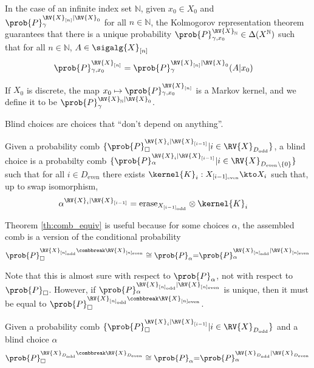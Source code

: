 In the case of an infinite index set $\mathbb{N}$, given $x_0\in X_0$ and $\prob{P}_\gamma^{\RV{X}_{[n]}|\RV{X}_0}$ for all $n\in \mathbb{N}$, the Kolmogorov representation theorem guarantees that there is a unique probability $\prob{P}_{\gamma,x_0}^{\RV{X}_{\mathbb{N}}}\in \Delta(X^{\mathbb{N}})$ such that for all $n\in \mathbb{N}$, $A\in \sigalg{X}_{[n]}$
\begin{align}
    \prob{P}_{\gamma,x_0}^{\RV{X}_{[n]}} &= \prob{P}_\gamma^{\RV{X}_{[n]}|\RV{X}_0}(A|x_0)
\end{align}

If $X_0$ is discrete, the map $x_0\mapsto \prob{P}_{\gamma,x_0}^{\RV{X}_{[n]}}$ is a Markov kernel, and we define it to be $\prob{P}_\gamma^{\RV{X}_{\mathbb{N}}|\RV{X}_0}$.

Blind choices are choices that ``don't depend on anything''.

\begin{definition}
Given a probability comb $\{\prob{P}_\square^{\RV{X}_{i}|\RV{X}_{[i-1]}}|i\in \RV{X}_{D_{\text{odd}}}\}$, a blind choice is a probabilty comb $\{\prob{P}_\alpha^{\RV{X}_{i}|\RV{X}_{[i-1]}}|i\in \RV{X}_{D_{\text{even}}\setminus \{0\}}\}$ such that for all $i\in D_{\text{even}}$ there exists $\kernel{K}_i:X_{[i-1]_\mathrm{even}}\kto X_i$ such that, up to swap isomorphism,
\begin{align}
    \alpha^{\RV{X}_{i}|\RV{X}_{[i-1]}} &= \mathrm{erase}_{X_{[i-1]_{\text{odd}}}} \otimes \kernel{K}_i
\end{align}
\end{definition}

Theorem \ref{th:comb_equiv} is useful because for some choices $\alpha$, the assembled comb is a version of the conditional probability
\begin{align}
\prob{P}_\square^{\RV{X}_{[n]_{\text{odd}}}\combbreak \RV{X}_{[n]_{\text{even}}}}\cong{\prob{P}_\alpha}{=}\prob{P}_\alpha^{\RV{X}_{[n]_{\text{odd}}}| \RV{X}_{[n]_{\text{even}}}}
\end{align}

Note that this is almost sure with respect to $\prob{P}_\alpha$, not with respect to $\prob{P}_\square$. However, if $\prob{P}_\alpha^{\RV{X}_{[n]_{\text{odd}}}| \RV{X}_{[n]_{\text{even}}}}$ is unique, then it must be equal to $\prob{P}_\square^{\RV{X}_{[n]_{\text{odd}}}\combbreak \RV{X}_{[n]_{\text{even}}}}$.

\begin{theorem}\label{th:comb_conditional_correspondence}
Given a probability comb $\{\prob{P}_\square^{\RV{X}_{i}|\RV{X}_{[i-1]}}|i\in \RV{X}_{D_{\text{odd}}}\}$ and a blind choice $\alpha$
\begin{align}
\prob{P}_\square^{\RV{X}_{D_{\text{odd}}}\combbreak \RV{X}_{D_{\text{even}}}}\cong{\prob{P}_\alpha}{=}\prob{P}_\alpha^{\RV{X}_{D_{\text{odd}}}| \RV{X}_{D_{\text{even}}}}
\end{align}
\end{theorem}

